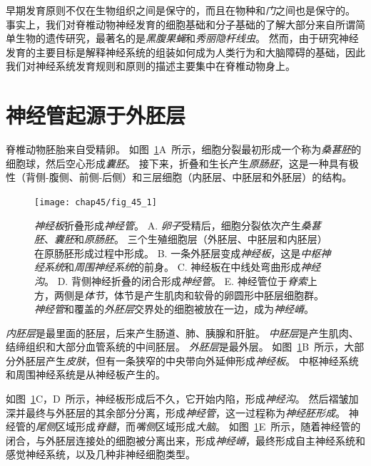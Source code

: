 早期发育原则不仅在生物组织之间是保守的，而且在物种和\textit{门}之间也是保守的。
事实上，我们对脊椎动物神经发育的细胞基础和分子基础的了解大部分来自所谓简单生物的遗传研究，最著名的是\textit{黑腹果蝇}和\textit{秀丽隐杆线虫}。
然而，由于研究神经发育的主要目标是解释神经系统的组装如何成为人类行为和大脑障碍的基础，因此我们对神经系统发育规则和原则的描述主要集中在脊椎动物身上。



\section{神经管起源于外胚层}

脊椎动物胚胎来自受精卵。
如图~\ref{fig:45_1}A~所示，细胞分裂最初形成一个称为\textit{桑葚胚}的细胞球，然后空心形成\textit{囊胚}。
接下来，折叠和生长产生\textit{原肠胚}，这是一种具有极性（背侧-腹侧、前侧-后侧）和三层细胞（内胚层、中胚层和外胚层）的结构。


\begin{figure}[htbp]
	\centering
	\texttt{[image: chap45/fig\_45\_1]}
	\caption{\textit{神经板}折叠形成\textit{神经管}。
		A. \textit{卵子}受精后，细胞分裂依次产生\textit{桑葚胚}、\textit{囊胚}和\textit{原肠胚}。
		三个生殖细胞层（外胚层、中胚层和内胚层）在原肠胚形成过程中形成。
		B. 一条外胚层变成\textit{神经板}，这是\textit{中枢神经系统}和\textit{周围神经系统}的前身。
		C. 神经板在中线处弯曲形成\textit{神经沟}。
		D. 背侧神经折叠的闭合形成\textit{神经管}。
		E. 神经管位于\textit{脊索}上方，两侧是\textit{体节}，体节是产生肌肉和软骨的卵圆形中胚层细胞群。
		\textit{神经管}和覆盖的\textit{外胚层}交界处的细胞被放在一边，成为\textit{神经嵴}。}
	\label{fig:45_1}
\end{figure}


\textit{内胚层}是最里面的胚层，后来产生肠道、肺、胰腺和肝脏。
\textit{中胚层}是产生肌肉、结缔组织和大部分血管系统的中间胚层。
\textit{外胚层}是最外层。
如图~\ref{fig:45_1}B~所示，大部分外胚层产生\textit{皮肤}，但有一条狭窄的中央带向外延伸形成\textit{神经板}。
中枢神经系统和周围神经系统是从神经板产生的。


如图~\ref{fig:45_1}C，D~所示，神经板形成后不久，它开始内陷，形成\textit{神经沟}。
然后褶皱加深并最终与外胚层的其余部分分离，形成\textit{神经管}，这一过程称为\textit{神经胚形成}。
神经管的\textit{尾侧}区域形成\textit{脊髓}，而\textit{嘴侧}区域形成\textit{大脑}。
如图~\ref{fig:45_1}E~所示，随着神经管的闭合，与外胚层连接处的细胞被分离出来，形成\textit{神经嵴}，最终形成自主神经系统和感觉神经系统，以及几种非神经细胞类型。



